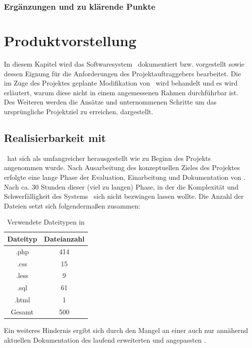 \subsection{Ergänzungen und zu klärende Punkte}

\chapter{Produktvorstellung}
In diesem Kapitel wird das Softwaresystem \getOst\ dokumentiert bzw. vorgestellt sowie dessen Eignung für die Anforderungen des Projektauftraggebers bearbeitet. Die im Zuge des Projektes geplante Modifikation von \getOst\ wird behandelt und es wird erläutert, warum diese nicht in einem angemessenen Rahmen durchführbar ist. Des Weiteren werden die Ansätze und unternommenen Schritte um das ursprüngliche Projektziel zu erreichen, dargestellt.

\section{Realisierbarkeit mit \getOst} \label{Realisierbarkeit mit \getOst}
\getOst\ hat sich als umfangreicher herausgestellt wie zu Beginn des Projekts angenommen wurde. Nach Ausarbeitung des konzeptuellen Zieles des Projektes erfolgte eine lange Phase der Evaluation, Einarbeitung und Dokumentation von \getOst. Nach ca. 30 Stunden dieser (viel zu langen) Phase, in der die Komplexität und Schwerfälligkeit des Systems \getOst\ sich nicht bezwingen lassen wollte. Die Anzahl der Dateien setzt sich folgendermaßen zusammen:

\begin{table}
	\centering
	\begin{tabular}{|c|c|}
		\hline 
		Dateityp	& Dateianzahl \\ 
		\hline 
		.php		& 414 \\ 
		\hline 
		.css		& 15 \\ 
		\hline 
		.less		& 9 \\ 
		\hline 
		.sql		& 61 \\ 
		\hline 
		.html		& 1 \\ 
		\hline
		\hline 
		Gesamt		& 500 \\ 
		\hline 
	\end{tabular}

	\label{tbl_ost_dateianzahl}
	\caption{Verwendete Dateitypen in \getOst}
\end{table}

Ein weiteres Hindernis ergibt sich durch den Mangel an einer auch nur annähernd aktuellen Dokumentation des laufend erweiterten und angepassten \getOst.

